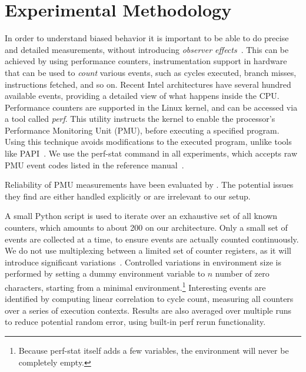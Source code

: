 \documentclass{acm_proc_article-sp}
\begin{document}
\section{Experimental Methodology}
\label{sec:methodology}
In order to understand biased behavior it is important to be able to do precise and detailed measurements, without introducing \emph{observer effects}~\cite{Mytkowicz:2008:OE&MB}.
This can be achieved by using performance counters, instrumentation support in hardware that can be used to \emph{count} various events, such as cycles executed, branch misses, instructions fetched, and so on.
Recent Intel architectures have several hundred available events, providing a detailed view of what happens inside the CPU.
Performance counters are supported in the Linux kernel, and can be accessed via a tool called \emph{perf}.
This utility instructs the kernel to enable the processor's Performance Monitoring Unit (PMU), before executing a specified program.
Using this technique avoids modifications to the executed program, unlike tools like PAPI~\cite{PAPI:PortableInterface}.
We use the perf-stat command in all experiments, which accepts raw PMU event codes listed in the reference manual~\cite{Volume3B}.

Reliability of PMU measurements have been evaluated by .
The potential issues they find are either handled explicitly or are irrelevant to our setup.

A small Python script is used to iterate over an exhaustive set of all known counters, which amounts to about 200 on our architecture.
Only a small set of events are collected at a time, to ensure events are actually counted continuously.
We do not use multiplexing between a limited set of counter registers, as it will introduce significant variations~\cite{Wiplove:ImproveEstimation}. %
Controlled variations in environment size is performed by setting a dummy environment variable to $n$ number of zero characters, starting from a minimal environment.\footnote{Because perf-stat itself adds a few variables, the environment will never be completely empty.}
Interesting events are identified by computing linear correlation to cycle count, measuring all counters over a series of execution contexts.
Results are also averaged over multiple runs to reduce potential random error, using built-in perf rerun functionality.
\end{document}
